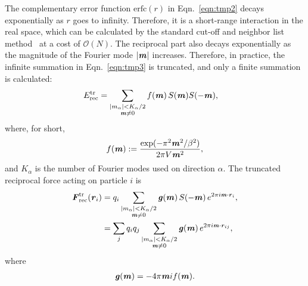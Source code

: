 \documentclass[aps,pre,preprint]{revtex4}
\renewcommand{\v}[1]{\textbf{\textit{#1}}}
\begin{document}
The complementary error function $\textrm{erfc}(r)$ in
Eqn.~\eqref{eqn:tmp2} decays exponentially as $r$ goes to infinity.
Therefore, it is a short-range interaction in the real space, which
can be calculated by the standard cut-off and neighbor list
method~\cite{frenkel02b} at a cost of $\mathcal O(N)$.  The reciprocal
part also decays exponentially as the magnitude of the Fourier mode
$\vert\v m\vert$ increases. Therefore, in practice, the infinite
summation in Eqn.~\eqref{eqn:tmp3} is truncated, and only a finite
summation is calculated:
\begin{align}\label{eqn:tmp6}
  E^{\textrm{tr}}_{\textrm{rec}} & =
  \sum_{
    \begin{subarray}{c}
      \vert m_\alpha\vert < K_\alpha/2\\
      \v m\neq 0
    \end{subarray}}
  f(\v m)\, S(\v m) S(-\v m),
\end{align}
where, for short,
\begin{align}
  f(\v m) := \frac{\exp(-\pi^2 \v m^2 / \beta^2)}{2\pi V \v m^2},
\end{align}
and $K_\alpha$ is the number of Fourier modes used on direction
$\alpha$.  The truncated reciprocal force acting on particle $i$ is
\begin{align}\nonumber
  \v F^{\textrm{tr}}_{\textrm{rec}}(\v r_i)
  &= 
  q_i 
  \sum_{
    \begin{subarray}{c}
      \vert m_\alpha\vert < K_\alpha/2\\
      \v m\neq 0
    \end{subarray}}
  \v g(\v m) \,
  S(-\v m)\,
  e^{2\pi i\v m\cdot\v r_i}, \\\label{eqn:tmp8}
  &= 
  \sum_j   q_iq_j
  \sum_{
    \begin{subarray}{c}
      \vert m_\alpha\vert < K_\alpha/2\\
      \v m\neq 0
    \end{subarray}}
  \v g(\v m) \,
  e^{2\pi i\v m\cdot\v r_{ij}},
\end{align}
where
\begin{align}
  \v g(\v m) = -4 \pi \v m i f(\v m).
\end{align}


\end{document}
